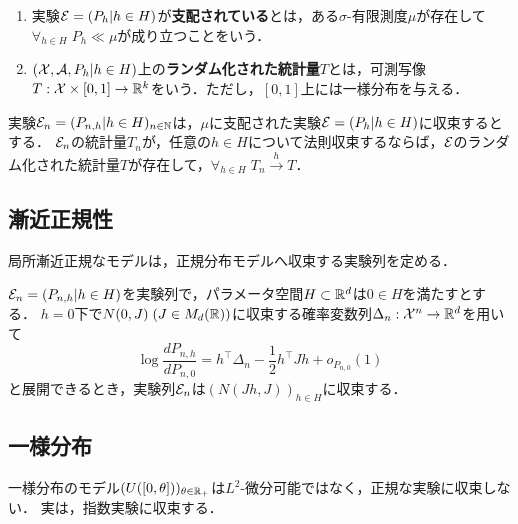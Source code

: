 \documentclass[uplatex,dvipdfmx]{jsreport}
\begin{document}
\begin{definition}\mbox{}
    \begin{enumerate}
        \item 実験$\mathcal{E}=(P_h|h\in H)$が\textbf{支配されている}とは，ある$\sigma$-有限測度$\mu$が存在して$\forall_{h\in H}\;P_h\ll\mu$が成り立つことをいう．
        \item $(\mathcal{X},\mathcal{A},P_h|h\in H)$上の\textbf{ランダム化された統計量}$T$とは，可測写像$T:\mathcal{X}\times[0,1]\to\mathbb{R}^k$をいう．ただし，$[0,1]$上には一様分布を与える．
    \end{enumerate}
\end{definition}

\begin{theorem}[法則収束統計量の漸近表現定理]
    実験$\mathcal{E}_n=(P_{n,h}|h\in H)_{n\in\mathbb{N}}$は，$\mu$に支配された実験$\mathcal{E}=(P_h|h\in H)$に収束するとする．
    $\mathcal{E}_n$の統計量$T_n$が，任意の$h\in H$について法則収束するならば，$\mathcal{E}$のランダム化された統計量$T$が存在して，$\forall_{h\in H}\;T_n\xrightarrow{h}T$．
\end{theorem}

\subsection{漸近正規性}

\begin{tcolorbox}[colframe=ForestGreen, colback=ForestGreen!10!white,breakable,colbacktitle=ForestGreen!40!white,coltitle=black,fonttitle=\bfseries\sffamily,
title=]
    局所漸近正規なモデルは，正規分布モデルへ収束する実験列を定める．
\end{tcolorbox}

\begin{theorem}
    $\mathcal{E}_n=(P_{n,h}|h\in H)$を実験列で，パラメータ空間$H\subset\mathbb{R}^d$は$0\in H$を満たすとする．
    $h=0$下で$N(0,J)\;(J\in M_d(\mathbb{R}))$に収束する確率変数列$\Delta_n:\mathcal{X}^n\to\mathbb{R}^d$を用いて
    \[\log\frac{dP_{n,h}}{dP_{n,0}}=h^\top\Delta_n-\frac{1}{2}h^\top Jh+o_{P_{n,0}}(1)\]
    と展開できるとき，実験列$\mathcal{E}_n$は$(N(Jh,J))_{h\in H}$に収束する．
\end{theorem}

\subsection{一様分布}

\begin{tcolorbox}[colframe=ForestGreen, colback=ForestGreen!10!white,breakable,colbacktitle=ForestGreen!40!white,coltitle=black,fonttitle=\bfseries\sffamily,
title=]
    一様分布のモデル$(U([0,\theta]))_{\theta\in\mathbb{R}_+}$は$L^2$-微分可能ではなく，正規な実験に収束しない．
    実は，指数実験に収束する．
\end{tcolorbox}
\end{document}
